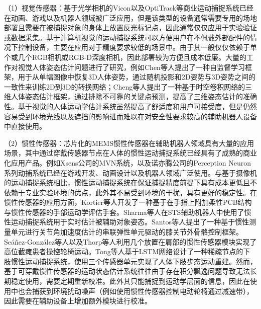 （1）视觉传感器：基于光学相机的Vicon\cite{ViconAwardWinning}以及OptiTrack\cite{MotionCaptureSystems}等商业运动捕捉系统已经在动画、游戏以及机器人领域被广泛应用，但是该类型的设备通常需要专用的场地部署且需要在被捕捉对象的身体上放置反光标记点，因此通常仅仅应用于实验验证或数据采集。基于计算机视觉的运动捕捉系统可以方便用户在不佩戴外部配件的情况下控制设备\cite{wangDeep3DHuman2021}，主要在应用对于精度要求较低的场景中。由于其一般仅仅依赖于单个或几个RGB相机或RGB-D深度相机，因此部署较为方便且成本低廉。大量的工作对视觉人体姿态估计问题进行了研究，例如Chen等人\cite{chenUnsupervised3DPose2019}提出了一种自监督学习框架，用于从单幅图像中恢复3D人体姿势，通过随机投影和2D姿势与3D姿势之间的一致性来训练2D到3D的转换网络；Cheng等人\cite{chengOcclusionAwareNetworks3D2019}提出了一种基于时空卷积网络的三维人体姿态估计框架，通过排除不可靠的关键点预测，提高了三维姿态估计的准确性。基于视觉的人体运动学估计系统虽然提高了舒适度和用户可接受度，但是仍然容易受到环境光线以及遮挡的影响\cite{scardovelliDesignEvaluationPeripheral2015}进而难以在对安全性要求较高的辅助机器人设备中直接使用。

（2）惯性传感器：芯片化的MEMS惯性传感器在辅助机器人领域具有大量的应用场景，其中通过穿戴传感器节点在人体的惯性运动捕捉系统已经具有了成熟的商业化应用产品。例如Xsens公司的MVN系统\cite{XsensProductsMovella}，以及诺亦腾公司的Perception Neuron系列\cite{NoitomNuoYiTengGuanWang}动捕系统已经在游戏开发、动画设计以及机器人领域广泛使用。与基于摄像机的运动捕捉系统相比，惯性运动捕捉系统在保证捕捉精度前提下具有成本更低且不依赖于专业实验环境的优点，此外其不易受到环境的干扰，具有更好的稳定性。在惯性传感器的应用方面，Kortier等人\cite{kortierAssessmentHandKinematics2014}开发了一种基于在手指上附加柔性PCB结构与惯性传感器的手部运动学评估手套。Sharma等人\cite{sharmaBiomechanicalTrajectoryOptimization2022,sharmaPhysicalHumanRobotInteraction2022}在STS辅助机器人中使用了惯性运动捕捉系统用于实时估计被辅助对象姿态。Santos等人\cite{dossantosIMUbasedTransparencyControl2022}提出了一种基于惯性测量单元进行关节角加速度估计的串联弹性单元驱动的膝关节外骨骼控制框架。Seáñez-González等人\cite{seanez-gonzalezStaticDynamicDecoding2017}以及Thorp等人\cite{thorpUpperBodyBasedPower2016d}利用几个放置在肩部的惯性传感器模块实现了高位截瘫患者操控轮椅运动。Tong等人\cite{tongLSTMBasedLowerLimbs2020}基于LSTM网络设计了一种稀疏节点的下肢惯性运动捕捉系统，使用三个传感器单元实现了人体下肢步态运动重建。然而，基于可穿戴惯性传感器的运动状态估计系统往往由于存在积分飘逸问题导致无法长期稳定使用，需要定期重新校准。此外其只能捕捉到运动学层面的信息，因此在使用中也会捕获到环境扰动噪声（例如使用惯性传感器控制电动轮椅通过减速带），因此需要在辅助设备上增加额外模块进行校准。

